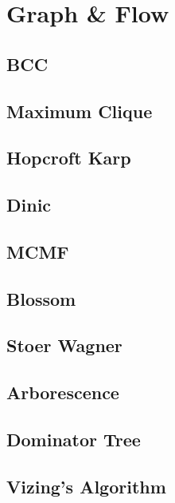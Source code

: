 \documentclass[10pt,landscape,a4paper,twocolumn]{article}
\begin{document}
\section{Graph \& Flow}
\subsection{BCC}


\subsection{Maximum Clique}


\subsection{Hopcroft Karp}


\subsection{Dinic}


\subsection{MCMF}


\subsection{Blossom}


\subsection{Stoer Wagner}


\subsection{Arborescence}


\subsection{Dominator Tree}


\subsection{Vizing's Algorithm}

\end{document}

